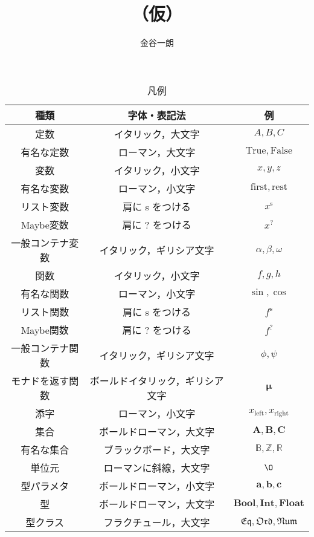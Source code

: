 \documentclass[a4paper,draft]{jsbook}
\title{\haskell （仮）}
\author{金谷一朗}
\newcommand{\mSpecialConst}[1]{\mathrm{#1}} %
\newcommand{\mTrue}{\mSpecialConst{True}}
\newcommand{\mFalse}{\mSpecialConst{False}}
\newcommand{\mZero}{\O}
\newcommand{\mSpecialVar}[1]{\mathrm{#1}} %
\newcommand{\mFirstVar}{\mSpecialVar{first}}
\newcommand{\mRestVar}{\mSpecialVar{rest}}
\newcommand{\mSpecialSub}[1]{\text{#1}}
\newcommand{\mLeft}{\mSpecialSub{left}}
\newcommand{\mRight}{\mSpecialSub{right}}
\newcommand{\mSet}[1]{\mathbf{#1}}
\newcommand{\mSpecialSet}[1]{\mathbb{#1}} %
\newcommand{\mRSet}{\mSpecialSet{R}}
\newcommand{\mZSet}{\mSpecialSet{Z}}
\newcommand{\mBSet}{\mSpecialSet{B}}
\newcommand{\mTypeParameter}[1]{\mathbf{#1}}
\newcommand{\mType}[1]{\mathbf{#1}}
\newcommand{\mBoolType}{\mType{Bool}}
\newcommand{\mIntType}{\mType{Int}}
\newcommand{\mFloatType}{\mType{Float}}
\newcommand{\mSpecialTypeClass}[1]{\mathfrak{#1}} %
\newcommand{\mEqTypeClass}{\mSpecialTypeClass{Eq}}
\newcommand{\mOrdTypeClass}{\mSpecialTypeClass{Ord}}
\newcommand{\mNumTypeClass}{\mSpecialTypeClass{Num}}
\newcommand{\mListVar}[1]{{#1}^\mathrm{s}}
\newcommand{\mMaybeVar}[1]{{#1}^\text{?}}
\newcommand{\mMonadFunc}[1]{{\boldsymbol#1}}
\newcommand{\mathVarKeyword}[1]{\operatorname{\mathrm{#1}}}
\newcommand{\mFirstVar}{\mathVarKeyword{first}}
\begin{document}
\setlength{\baselineskip}{17pt}
\maketitle
\tableofcontents

\begin{table*}
\caption{凡例}
\begin{center}
\begin{tabular}{||c|c|c||}
\hline
種類&字体・表記法&例\\
\hline\hline
定数&イタリック，大文字&$A,B,C$\\
有名な定数&ローマン，大文字&$\mTrue,\mFalse$\\
\hline
変数&イタリック，小文字&$x,y,z$\\
有名な変数&ローマン，小文字&$\mFirstVar,\mRestVar$\\
リスト変数&肩に s をつける&$\mListVar{x}$\\
Maybe変数&肩に ? をつける&$\mMaybeVar{x}$\\
一般コンテナ変数&イタリック，ギリシア文字&$\alpha,\beta,\omega$\\
\hline
関数&イタリック，小文字&$f,g,h$\\
有名な関数&ローマン，小文字&$\sin,\cos$\\
リスト関数&肩に s をつける&$\mListVar{f}$\\
Maybe関数&肩に ? をつける&$\mMaybeVar{f}$\\
一般コンテナ関数&イタリック，ギリシア文字&$\phi,\psi$\\
モナドを返す関数&ボールドイタリック，ギリシア文字&$\mMonadFunc{\mu}$\\
\hline
添字&ローマン，小文字&$x_\mLeft,x_\mRight$\\
\hline
集合&ボールドローマン，大文字&$\mSet{A},\mSet{B},\mSet{C}$\\
有名な集合&ブラックボード，大文字&$\mBSet,\mZSet,\mRSet$\\
単位元&ローマンに斜線，大文字&$\mZero$\\
\hline
型パラメタ&ボールドローマン，小文字&$\mTypeParameter{a},\mTypeParameter{b},\mTypeParameter{c}$\\
型&ボールドローマン，大文字&$\mBoolType,\mIntType,\mFloatType$\\
型クラス&フラクチュール，大文字&$\mEqTypeClass,\mOrdTypeClass,\mNumTypeClass$\\

\end{tabular}
\end{center}
\end{table*}
\end{document}
